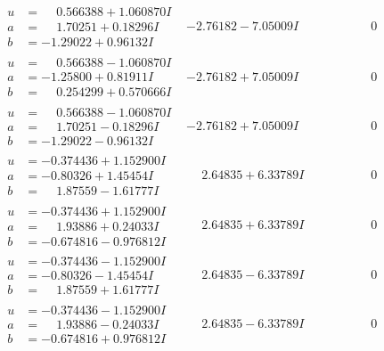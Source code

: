 \documentclass[1p]{elsarticle_modified}
\theoremstyle{definition}
\begin{document}
$$\begin{array}{c|c|c}
\begin{aligned}
u &= \phantom{-}0.566388 + 1.060870 I \\
a &= \phantom{-}1.70251 + 0.18296 I \\
b &= -1.29022 + 0.96132 I\end{aligned}
 & -2.76182 - 7.05009 I & \phantom{-0.000000 } 0 \\ \hline\begin{aligned}
u &= \phantom{-}0.566388 - 1.060870 I \\
a &= -1.25800 + 0.81911 I \\
b &= \phantom{-}0.254299 + 0.570666 I\end{aligned}
 & -2.76182 + 7.05009 I & \phantom{-0.000000 } 0 \\ \hline\begin{aligned}
u &= \phantom{-}0.566388 - 1.060870 I \\
a &= \phantom{-}1.70251 - 0.18296 I \\
b &= -1.29022 - 0.96132 I\end{aligned}
 & -2.76182 + 7.05009 I & \phantom{-0.000000 } 0 \\ \hline\begin{aligned}
u &= -0.374436 + 1.152900 I \\
a &= -0.80326 + 1.45454 I \\
b &= \phantom{-}1.87559 - 1.61777 I\end{aligned}
 & \phantom{-}2.64835 + 6.33789 I & \phantom{-0.000000 } 0 \\ \hline\begin{aligned}
u &= -0.374436 + 1.152900 I \\
a &= \phantom{-}1.93886 + 0.24033 I \\
b &= -0.674816 - 0.976812 I\end{aligned}
 & \phantom{-}2.64835 + 6.33789 I & \phantom{-0.000000 } 0 \\ \hline\begin{aligned}
u &= -0.374436 - 1.152900 I \\
a &= -0.80326 - 1.45454 I \\
b &= \phantom{-}1.87559 + 1.61777 I\end{aligned}
 & \phantom{-}2.64835 - 6.33789 I & \phantom{-0.000000 } 0 \\ \hline\begin{aligned}
u &= -0.374436 - 1.152900 I \\
a &= \phantom{-}1.93886 - 0.24033 I \\
b &= -0.674816 + 0.976812 I\end{aligned}
 & \phantom{-}2.64835 - 6.33789 I & \phantom{-0.000000 } 0 \\ \hline\begin{aligned}

\end{aligned}
\end{array}$$
\end{document}
